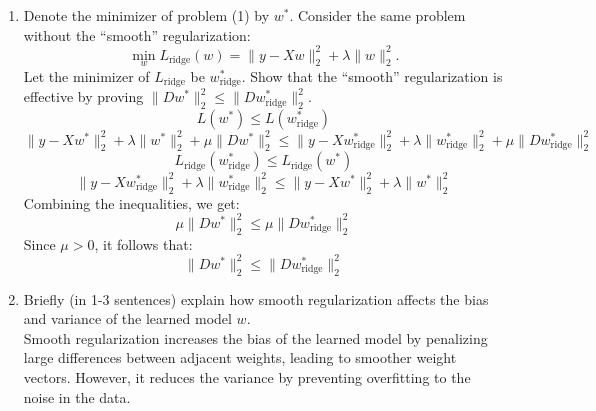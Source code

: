 \documentclass[a3paper,12pt]{extarticle} %
\begin{document}
\begin{enumerate}
\begin{enumerate}
        \item Denote the minimizer of problem (1) by \( w^* \). Consider the same problem without the “smooth” regularization:
        \[
        \min_w L_{\text{ridge}}(w) = \|y - Xw\|_2^2 + \lambda \|w\|_2^2.
        \]
        Let the minimizer of \( L_{\text{ridge}} \) be \( w^*_{\text{ridge}} \). Show that the “smooth” regularization is effective by proving \(\|Dw^*\|_2^2 \leq \|Dw^*_{\text{ridge}}\|_2^2\).
        \[
        L(w^*) \leq L(w^*_{\text{ridge}})
        \]
        \[
        \|y - Xw^*\|_2^2 + \lambda \|w^*\|_2^2 + \mu \|Dw^*\|_2^2 \leq \|y - Xw^*_{\text{ridge}}\|_2^2 + \lambda \|w^*_{\text{ridge}}\|_2^2 + \mu \|Dw^*_{\text{ridge}}\|_2^2
        \]
        \[
        L_{\text{ridge}}(w^*_{\text{ridge}}) \leq L_{\text{ridge}}(w^*)
        \]
        \[
        \|y - Xw^*_{\text{ridge}}\|_2^2 + \lambda \|w^*_{\text{ridge}}\|_2^2 \leq \|y - Xw^*\|_2^2 + \lambda \|w^*\|_2^2
        \]
        Combining the inequalities, we get:
        \[
        \mu \|Dw^*\|_2^2 \leq \mu \|Dw^*_{\text{ridge}}\|_2^2
        \]
        Since \(\mu > 0\), it follows that:
        \[
        \|Dw^*\|_2^2 \leq \|Dw^*_{\text{ridge}}\|_2^2
        \]

        \item Briefly (in 1-3 sentences) explain how smooth regularization affects the bias and variance of the learned model \( w \).
        \\
        Smooth regularization increases the bias of the learned model by penalizing large differences between adjacent weights, leading to smoother weight vectors. However, it reduces the variance by preventing overfitting to the noise in the data.
    \end{enumerate}
\end{enumerate}
\newpage
\end{document}
